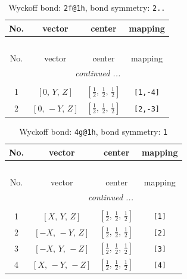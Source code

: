 \documentclass[fleqn,8pt]{jsarticle}
\begin{document}
\begin{longtable}{cccc}
\caption{Wyckoff bond: {\tt 2f@1h}, bond symmetry: {\tt 2..}}
 \\
 \hline \hline
No. & vector & center & mapping \\ \hline \endfirsthead

\multicolumn{3}{l}{\tablename\ \thetable{}} \\
 \hline \hline
No. & vector & center & mapping \\ \hline \endhead

 \hline \hline
\multicolumn{3}{r}{\footnotesize\it continued ...} \\ \endfoot

 \hline \hline
\multicolumn{3}{r}{} \\ \endlastfoot

1 & $\left[ 0,\, Y,\, Z \right]$ & $\left[ \frac{1}{2},\, \frac{1}{2},\, \frac{1}{2} \right]$ & {\tt [1,-4]} \\ \hline
2 & $\left[ 0,\, - Y,\, Z \right]$ & $\left[ \frac{1}{2},\, \frac{1}{2},\, \frac{1}{2} \right]$ & {\tt [2,-3]} \\
\end{longtable}
\renewcommand{\arraystretch}{1.2}
\begin{longtable}{cccc}
\caption{Wyckoff bond: {\tt 4g@1h}, bond symmetry: {\tt 1}}
 \\
 \hline \hline
No. & vector & center & mapping \\ \hline \endfirsthead

\multicolumn{3}{l}{\tablename\ \thetable{}} \\
 \hline \hline
No. & vector & center & mapping \\ \hline \endhead

 \hline \hline
\multicolumn{3}{r}{\footnotesize\it continued ...} \\ \endfoot

 \hline \hline
\multicolumn{3}{r}{} \\ \endlastfoot

1 & $\left[ X,\, Y,\, Z \right]$ & $\left[ \frac{1}{2},\, \frac{1}{2},\, \frac{1}{2} \right]$ & {\tt [1]} \\ \hline
2 & $\left[ - X,\, - Y,\, Z \right]$ & $\left[ \frac{1}{2},\, \frac{1}{2},\, \frac{1}{2} \right]$ & {\tt [2]} \\ \hline
3 & $\left[ - X,\, Y,\, - Z \right]$ & $\left[ \frac{1}{2},\, \frac{1}{2},\, \frac{1}{2} \right]$ & {\tt [3]} \\ \hline
4 & $\left[ X,\, - Y,\, - Z \right]$ & $\left[ \frac{1}{2},\, \frac{1}{2},\, \frac{1}{2} \right]$ & {\tt [4]} \\
\end{longtable}
\end{document}

